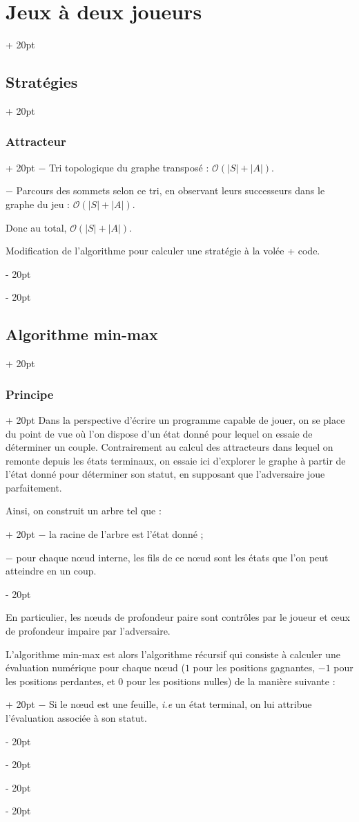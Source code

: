 \documentclass[a4paper, 12pt, twoside]{article}
\newcommand{\abs}[1]{\left\lvert #1 \right\rvert}
\newcommand{\ind}[1][20pt]{\advance\leftskip + #1}
\newcommand{\deind}[1][20pt]{\advance\leftskip - #1}
\newenvironment{indt}[2][20pt]{#2 \par \ind[#1]}{\par \deind} %
\begin{document}
\begin{indt}{\section{Jeux à deux joueurs}}
\begin{indt}{\subsection{Stratégies}}
\begin{indt}{\subsubsection{Attracteur}}
                $-$ Tri topologique du graphe transposé : $\mathcal O(\abs S + \abs A)$.

                $-$ Parcours des sommets selon ce tri, en observant leurs successeurs dans le graphe du jeu : $\mathcal O(\abs S + \abs A)$.

                Donc au total, $\mathcal O(\abs S + \abs A)$.

                \vspace{12pt}
                
                 Modification de l'algorithme pour calculer une stratégie à la volée + code.
            \end{indt}
        \end{indt}

        \vspace{12pt}
        
        \begin{indt}{\subsection{Algorithme min-max}}
            \begin{indt}{\subsubsection{Principe}}
                Dans la perspective d'écrire un programme capable de jouer, on se place du point de vue où l'on dispose d'un état donné pour lequel on essaie de déterminer un couple. Contrairement au calcul des attracteurs dans lequel on remonte depuis les états terminaux, on essaie ici d'explorer le graphe à partir de l'état donné pour déterminer son statut, en supposant que l'adversaire joue parfaitement.

                \begin{indt}{Ainsi, on construit un arbre tel que :}
                    $-$ la racine de l'arbre est l'état donné ;

                    $-$ pour chaque n\oe ud interne, les fils de ce n\oe ud sont les états que l'on peut atteindre en un coup.
                \end{indt}

                En particulier, les n\oe uds de profondeur paire sont contrôles par le joueur et ceux de profondeur impaire par l'adversaire.

                \begin{indt}{L'algorithme min-max est alors l'algorithme récursif qui consiste à calculer une évaluation numérique pour chaque n\oe ud ($1$ pour les positions gagnantes, $-1$ pour les positions perdantes, et $0$ pour les positions nulles) de la manière suivante :}
                    $-$ Si le n\oe ud est une feuille, \textit{i.e} un état terminal, on lui attribue l'évaluation associée à son statut.


\end{indt}
\end{indt}
\end{indt}
\end{indt}
\end{document}

